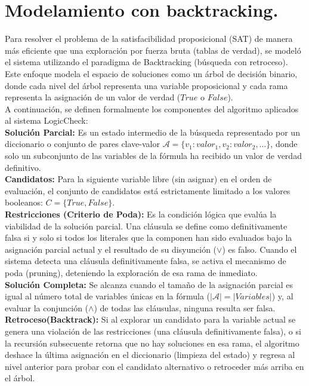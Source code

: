 \documentclass[12pt,a4paper]{article}
\begin{document}
\section{Modelamiento con backtracking.}
Para resolver el problema de la satisfacibilidad proposicional (SAT) de manera más eficiente que una exploración por fuerza bruta (tablas de verdad), se modeló el sistema utilizando el paradigma de Backtracking (búsqueda con retroceso). Este enfoque modela el espacio de soluciones como un árbol de decisión binario, donde cada nivel del árbol representa una variable proposicional y cada rama representa la asignación de un valor de verdad ($True$ o $False$).\\ A continuación, se definen formalmente los componentes del algoritmo aplicados al sistema LogicCheck:\\ 
\textbf{Solución Parcial:} Es un estado intermedio de la búsqueda representado por un diccionario o conjunto de pares clave-valor $\mathcal{A} = \{v_1: valor_1, v_2: valor_2, \dots\}$, donde solo un subconjunto de las variables de la fórmula ha recibido un valor de verdad definitivo.\\ 
\textbf{Candidatos:} Para la siguiente variable libre (sin asignar) en el orden de evaluación, el conjunto de candidatos está estrictamente limitado a los valores booleanos: $C = \{True, False\}$.\\ 
\textbf{Restricciones (Criterio de Poda):} Es la condición lógica que evalúa la viabilidad de la solución parcial. Una cláusula se define como definitivamente falsa si y solo si todos los literales que la componen han sido evaluados bajo la asignación parcial actual y el resultado de su disyunción ($\lor$) es falso. Cuando el sistema detecta una cláusula definitivamente falsa, se activa el mecanismo de poda (pruning), deteniendo la exploración de esa rama de inmediato.\\ \textbf{Solución Completa:} Se alcanza cuando el tamaño de la asignación parcial es igual al número total de variables únicas en la fórmula ($|\mathcal{A}| = |Variables|$) y, al evaluar la conjunción ($\land$) de todas las cláusulas, ninguna resulta ser falsa.\\
\textbf{Retroceso(Backtrack):} Si al explorar un candidato para la variable actual se genera una violación de las restricciones (una cláusula definitivamente falsa), o si la recursión subsecuente retorna que no hay soluciones en esa rama, el algoritmo deshace la última asignación en el diccionario (limpieza del estado) y regresa al nivel anterior para probar con el candidato alternativo o retroceder más arriba en el árbol.\\  
\end{document}
